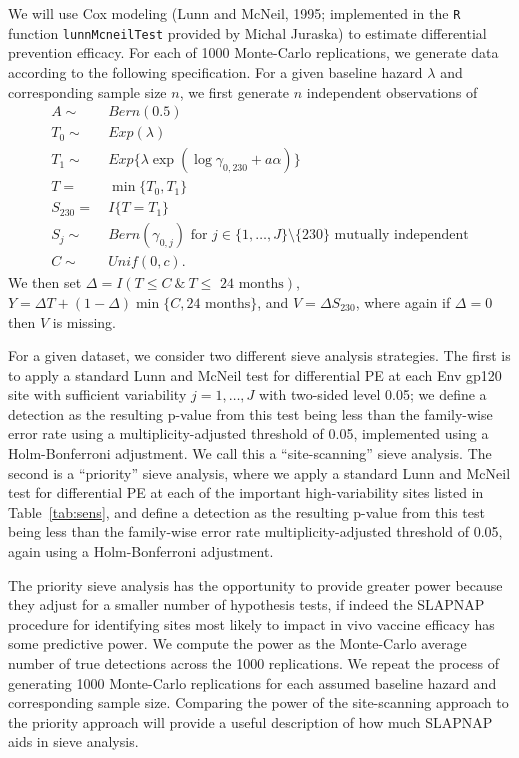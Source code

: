 \documentclass[10pt]{article}
\begin{document}
We will use Cox modeling (Lunn and McNeil, 1995; implemented in the \texttt{R} function \texttt{lunnMcneilTest} provided by Michal Juraska) to estimate differential prevention efficacy. For each of 1000 Monte-Carlo replications, we generate data according to the following specification. For a given baseline hazard $\lambda$ and corresponding sample size $n$, we first generate $n$ independent observations of
\begin{align*}
  A \sim & \ Bern(0.5) \\
  T_0 \sim & \ Exp(\lambda) \\
  T_1 \sim & \ Exp\{\lambda\exp(\log \gamma_{0,230} + a \alpha)\} \\
  T =& \ \min\{T_0, T_1\} \\
  S_{230} =& \ I\{T = T_1\} \\
  S_j \sim & \ Bern(\gamma_{0,j}) \text{ for } j \in \{1, \ldots, J\} \setminus \{230\} \text{ mutually independent} \\
  C \sim & \ Unif(0, c).
\end{align*}
We then set $\Delta = I(T \leq C \ \& \ T \leq \text{ 24 months})$, $Y = \Delta T + (1 - \Delta) \min\{C, 24 \text{ months}\}$, and $V = \Delta S_{230}$, where again if $\Delta = 0$ then $V$ is missing.

For a given dataset, we consider two different sieve analysis strategies. The first is to apply a standard Lunn and McNeil test for differential PE at each Env gp120 site with sufficient variability $j = 1, \ldots, J$ with two-sided level 0.05; we define a detection as the resulting p-value from this test being less than the family-wise error rate using a multiplicity-adjusted threshold of 0.05, implemented using a Holm-Bonferroni adjustment. We call this a ``site-scanning'' sieve analysis. The second is a ``priority'' sieve analysis, where we apply a standard Lunn and McNeil test for differential PE at each of the important high-variability sites listed in Table~\ref{tab:sens}, and define a detection as the resulting p-value from this test being less than the family-wise error rate multiplicity-adjusted threshold of 0.05, again using a Holm-Bonferroni adjustment.

The priority sieve analysis has the opportunity to provide greater power because they adjust for a smaller number of hypothesis tests, if indeed the SLAPNAP procedure for identifying sites most likely to impact in vivo vaccine efficacy has some predictive power. We compute the power as the Monte-Carlo average number of true detections across the 1000 replications. We repeat the process of generating 1000 Monte-Carlo replications for each assumed baseline hazard and corresponding sample size. Comparing the power of the site-scanning approach to the priority approach will provide a useful description of how much SLAPNAP aids in sieve analysis.
\end{document}
